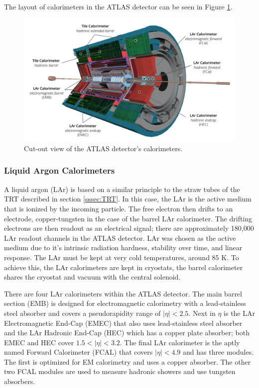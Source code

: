 	The layout of calorimeters in the ATLAS detector can be seen in Figure \ref{fig:calo-layout}.
	\begin{figure}[!ht]
	\centering
	\includegraphics[width=.65\textwidth,keepaspectratio=true]{chapters/chapter2_experiment/images/ATLAS_Calorimeters_Run3.png}
	\caption{ Cut-out view of the ATLAS detector's calorimeters.}
	\label{fig:calo-layout}
	\end{figure}

		\subsubsection{Liquid Argon Calorimeters}\label{sssec:LAr}
		A liquid argon (LAr) is based on a similar principle to the straw tubes of the TRT described in section \ref{sssec:TRT}. In this case, the LAr is the active medium that is ionized by the incoming particle. The free electron then drifts to an electrode, copper-tungsten in the case of the barrel LAr calorimeter. The drifting electrons are then readout as an electrical signal; there are approximately 180,000 LAr readout channels in the ATLAS detector. LAr was chosen as the active medium due to it's intrinsic radiation hardness, stability over time, and linear response. The LAr must be kept at very cold temperatures, around 85 K. To achieve this, the LAr calorimeters are kept in cryostats, the barrel calorimeter shares the cryostat and vacuum with the central solenoid.

		There are four LAr calorimeters within the ATLAS detector. The main barrel section (EMB) is designed for electromagnetic calorimetry with a lead-stainless steel absorber and covers a pseudorapidity range of $|\eta|<2.5$. Next in $\eta$ is the LAr Electromagnetic End-Cap (EMEC) that also uses lead-stainless steel absorber and the LAr Hadronic End-Cap (HEC) which has a copper plate absorber; both EMEC and HEC cover $1.5 < |\eta| < 3.2$. The final LAr calorimeter is the aptly named Forward Calorimeter (FCAL) that covers $|\eta|<4.9$ and has three modules. The first is optimized for EM calorimetry and uses a copper absorber. The other two FCAL modules are used to measure hadronic showers and use tungsten absorbers.

